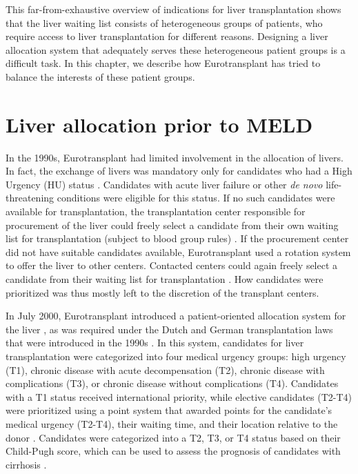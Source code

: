 \documentclass[11pt,twoside,]{book}
\begin{document}
This far-from-exhaustive overview of indications for liver transplantation
shows that the liver waiting list consists of heterogeneous groups of patients, who require access to liver transplantation for different reasons. Designing a
liver allocation system that adequately serves these heterogeneous patient
groups is a difficult task. In this chapter, we describe how Eurotransplant
has tried to balance the interests of these patient groups.

\section{Liver allocation prior to MELD}\label{liver-allocation-prior-to-meld}

In the 1990s, Eurotransplant had limited involvement in the allocation of livers.
In fact, the exchange of livers was mandatory only
for candidates who had a High Urgency
(HU) status \citep{HaaseKromwijk1999}. Candidates with acute liver failure or other
\emph{de novo} life-threatening conditions were eligible for this status. If
no such candidates were available for transplantation, the transplantation
center responsible for procurement of the liver could freely select a candidate
from their own waiting list for transplantation (subject to blood group rules) \citep{demeesterWhichABOmatchingRule2002}. If the procurement center did not have
suitable candidates available, Eurotransplant used a rotation system to
offer the liver to other centers. Contacted centers could again freely select
a candidate from their waiting list for transplantation \citep{Jost1997, Chapman1997}.
How candidates were prioritized was thus mostly left to the discretion of
the transplant centers.

In July 2000, Eurotransplant introduced a patient-oriented allocation system
for the liver \citep{Strassburg2004}, as was required under the Dutch and
German transplantation laws that were introduced in the 1990s \citep{HaaseKromwijk1999}. In this system, candidates for liver
transplantation were categorized into four medical urgency groups: high urgency
(T1), chronic disease with acute decompensation (T2), chronic disease with
complications (T3), or chronic disease without complications (T4). Candidates
with a T1 status received international priority, while elective candidates (T2-T4) were prioritized
using a point system that awarded points for the candidate's medical urgency (T2-T4), their waiting time, and their location relative to the donor \citep{minutesELIACMeeting2002}.
Candidates were categorized into a T2, T3, or T4 status based on their Child-Pugh
score, which can be used to assess the prognosis of candidates with cirrhosis \citep{Strassburg2004, Jung2008}.
\end{document}
